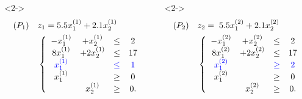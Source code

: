 \documentclass[10pt]{beamer}
\begin{document}
\begin{frame}
\bigskip
\begin{columns}
\begin{column}{0.5\textwidth}<2->
    \small
    \begin{equation*}
        \begin{split}
            (P_1) \quad &z_1= 5.5x^{(1)}_1 + 2.1x^{(1)}_2 \\
            & \left\{\begin{array} {cccc}
            -x^{(1)}_1 &+ x^{(1)}_2 &\leq& 2 \\
            8x^{(1)}_1 &+ 2x^{(1)}_2 &\leq& 17 \\
            \color{blue} x^{(1)}_1 && \color{blue} \leq &\color{blue} 1 \\
            x^{(1)}_1 &&\geq& 0 \\
            &x^{(1)}_2 &\geq& 0. \\
            \end{array}\right. \\
        \end{split}
    \end{equation*}
\end{column}
\begin{column}{0.5\textwidth}<2->
   \small
   \begin{equation*}
        \begin{split}
            (P_2) \quad &z_2= \hspace{0.1cm} 5.5x^{(2)}_1 + 2.1x^{(2)}_2  \\
            & \left\{\begin{array} {cccc}
            -x^{(2)}_1 &+ x^{(2)}_2 &\leq &2 \\
            8x^{(2)}_1 &+ 2x^{(2)}_2 &\leq &17 \\
            \color{blue} x^{(2)}_1 &&\color{blue}\geq&\color{blue} 2 \\
            x^{(2)}_1 &&\geq& 0 \\
            &x^{(2)}_2 &\geq& 0. \\
            \end{array}\right. \\
        \end{split}
    \end{equation*}
\end{column}
\end{columns}
\end{frame}
\end{document}
